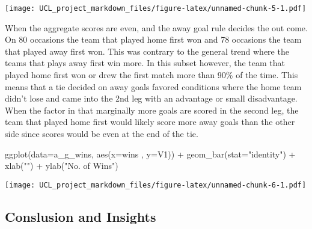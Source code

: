 \documentclass[
]{article}
\newenvironment{Shaded}{\begin{snugshade}}{\end{snugshade}}
\newcommand{\AttributeTok}[1]{\textcolor[rgb]{0.77,0.63,0.00}{#1}}
\newcommand{\FunctionTok}[1]{\textcolor[rgb]{0.00,0.00,0.00}{#1}}
\newcommand{\NormalTok}[1]{#1}
\newcommand{\SpecialCharTok}[1]{\textcolor[rgb]{0.00,0.00,0.00}{#1}}
\newcommand{\StringTok}[1]{\textcolor[rgb]{0.31,0.60,0.02}{#1}}
\begin{document}
\texttt{[image: UCL\_project\_markdown\_files/figure-latex/unnamed-chunk-5-1.pdf]}

When the aggregate scores are even, and the away goal rule decides the
out come. On 80 occasions the team that played home first won and 78
occasions the team that played away first won. This was contrary to the
general trend where the teams that plays away first win more. In this
subset however, the team that played home first won or drew the first
match more than 90\% of the time. This means that a tie decided on away
goals favored conditions where the home team didn't lose and came into
the 2nd leg with an advantage or small disadvantage. When the factor in
that marginally more goals are scored in the second leg, the team that
played home first would likely score more away goals than the other side
since scores would be even at the end of the tie.

\begin{Shaded}
\begin{Highlighting}[]
\FunctionTok{ggplot}\NormalTok{(}\AttributeTok{data=}\NormalTok{a\_g\_wins, }\FunctionTok{aes}\NormalTok{(}\AttributeTok{x=}\NormalTok{wins , }\AttributeTok{y=}\NormalTok{V1)) }\SpecialCharTok{+}
  \FunctionTok{geom\_bar}\NormalTok{(}\AttributeTok{stat=}\StringTok{"identity"}\NormalTok{) }\SpecialCharTok{+}
  \FunctionTok{xlab}\NormalTok{(}\StringTok{""}\NormalTok{) }\SpecialCharTok{+} \FunctionTok{ylab}\NormalTok{(}\StringTok{"No. of Wins"}\NormalTok{)}
\end{Highlighting}
\end{Shaded}

\texttt{[image: UCL\_project\_markdown\_files/figure-latex/unnamed-chunk-6-1.pdf]}

\hypertarget{conslusion-and-insights}{%
\subsection{Conslusion and Insights}\label{conslusion-and-insights}}
\end{document}
